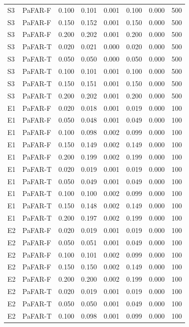 \begin{table}[tbp]
{\begin{tabular}{llrrrrrr}
S3 & PaFAR-F & 0.100 & 0.101 & 0.001 & 0.100 & 0.000 & 500 \\
S3 & PaFAR-F & 0.150 & 0.152 & 0.001 & 0.150 & 0.000 & 500 \\
S3 & PaFAR-F & 0.200 & 0.202 & 0.001 & 0.200 & 0.000 & 500 \\
S3 & PaFAR-T & 0.020 & 0.021 & 0.000 & 0.020 & 0.000 & 500 \\
S3 & PaFAR-T & 0.050 & 0.050 & 0.000 & 0.050 & 0.000 & 500 \\
S3 & PaFAR-T & 0.100 & 0.101 & 0.001 & 0.100 & 0.000 & 500 \\
S3 & PaFAR-T & 0.150 & 0.151 & 0.001 & 0.150 & 0.000 & 500 \\
S3 & PaFAR-T & 0.200 & 0.202 & 0.001 & 0.200 & 0.000 & 500 \\
E1 & PaFAR-F & 0.020 & 0.018 & 0.001 & 0.019 & 0.000 & 100 \\
E1 & PaFAR-F & 0.050 & 0.048 & 0.001 & 0.049 & 0.000 & 100 \\
E1 & PaFAR-F & 0.100 & 0.098 & 0.002 & 0.099 & 0.000 & 100 \\
E1 & PaFAR-F & 0.150 & 0.149 & 0.002 & 0.149 & 0.000 & 100 \\
E1 & PaFAR-F & 0.200 & 0.199 & 0.002 & 0.199 & 0.000 & 100 \\
E1 & PaFAR-T & 0.020 & 0.019 & 0.001 & 0.019 & 0.000 & 100 \\
E1 & PaFAR-T & 0.050 & 0.049 & 0.001 & 0.049 & 0.000 & 100 \\
E1 & PaFAR-T & 0.100 & 0.100 & 0.002 & 0.099 & 0.000 & 100 \\
E1 & PaFAR-T & 0.150 & 0.148 & 0.002 & 0.149 & 0.000 & 100 \\
E1 & PaFAR-T & 0.200 & 0.197 & 0.002 & 0.199 & 0.000 & 100 \\
E2 & PaFAR-F & 0.020 & 0.019 & 0.001 & 0.019 & 0.000 & 100 \\
E2 & PaFAR-F & 0.050 & 0.051 & 0.001 & 0.049 & 0.000 & 100 \\
E2 & PaFAR-F & 0.100 & 0.101 & 0.002 & 0.099 & 0.000 & 100 \\
E2 & PaFAR-F & 0.150 & 0.150 & 0.002 & 0.149 & 0.000 & 100 \\
E2 & PaFAR-F & 0.200 & 0.200 & 0.002 & 0.199 & 0.000 & 100 \\
E2 & PaFAR-T & 0.020 & 0.019 & 0.001 & 0.019 & 0.000 & 100 \\
E2 & PaFAR-T & 0.050 & 0.050 & 0.001 & 0.049 & 0.000 & 100 \\
E2 & PaFAR-T & 0.100 & 0.098 & 0.001 & 0.099 & 0.000 & 100 \\

\end{tabular}}
\end{table}
